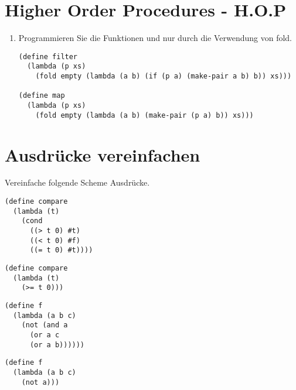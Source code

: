 \documentclass[11pt]{article}
\begin{document}
\section{Higher Order Procedures - H.O.P}

\begin{enumerate}
	\item Programmieren Sie die Funktionen  und  nur durch die Verwendung von fold.

\pm 


\begin{lstlisting}
(define filter
  (lambda (p xs)
    (fold empty (lambda (a b) (if (p a) (make-pair a b) b)) xs)))

(define map
  (lambda (p xs)
    (fold empty (lambda (a b) (make-pair (p a) b)) xs)))
\end{lstlisting}

\end{enumerate}

\section{Ausdrücke vereinfachen}

Vereinfache folgende Scheme Ausdrücke.

\ba
	\item \begin{lstlisting}
(define compare
  (lambda (t)
	(cond
	  ((> t 0) #t)
	  ((< t 0) #f)
	  ((= t 0) #t))))	
	\end{lstlisting}
	
	
	\begin{lstlisting}
(define compare
  (lambda (t)
    (>= t 0)))
	\end{lstlisting}
	
	\item 
	
	\begin{lstlisting}
(define f
  (lambda (a b c)
    (not (and a 
	  (or a c
	  (or a b))))))
	\end{lstlisting}
	
	
	\begin{lstlisting}
(define f
  (lambda (a b c)
    (not a)))
	\end{lstlisting}
\ea 
\end{document}
